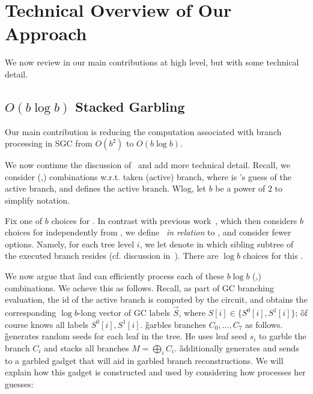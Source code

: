 
\section{Technical Overview of Our Approach}
\label{sec:techOverview}

We  now review in  our main contributions at high level, but with some technical detail.
\subsection{$O(b\log b)$ Stacked Garbling}
\label{sec:techOverviewSG}

Our main contribution is reducing the computation associated with branch processing in SGC from $O(b^2)$ to $O(b \log b)$.

We now continue the discussion of~ and add more technical detail.  
Recall, we consider (\truth,\guess) combinations w.r.t. taken (active) branch, where \guess is \E's guess of the active branch, and \truth defines the active branch.  Wlog, let $b$ be a power of $2$ to simplify notation.

Fix one of $b$ choices for \guess.  In contrast with previous work~\HK, which then considers $b$ choices for \truth independently from \guess, we define \truth\ {\em in relation} to \guess, and consider fewer \truth options.  Namely, for each tree level $i$, we  let \truth  denote in which sibling subtree of \guess the executed branch resides (cf. discussion in~).  There are $\log b$ choices for this \truth.  

We now argue that \G and \E can efficiently process each of these $b\log b$  (\truth,\guess) combinations.   We acheve this as follows.  Recall, as part of GC branching evaluation, the  id of the active branch is computed by the circuit, and \E obtains the corresponding $ \log b$-long vector of GC labels $\vec S$, where
$S[i] \in \{S^0[i],S^1[i]\}$; \G of course knows all labels $S^0[i],S^1[i]$.
\G  garbles branches  $C_0,...,C_7$ as follows.  \G generates  random seeds for 
each leaf in the tree.  He uses leaf seed $s_i$ to garble the branch $C_i$ and stacks all branches $M=\bigoplus_i C_i$.  \G additionally generates and sends to \E a garbled gadget that will aid \E in garbled  branch reconstructions.  We will explain how this gadget is constructed and used by considering how \E processes her guesses:




